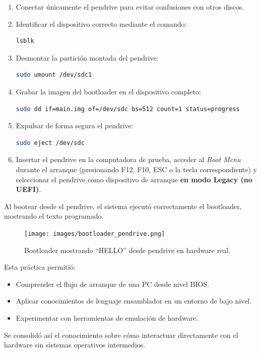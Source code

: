 \begin{enumerate}
    \item Conectar únicamente el pendrive para evitar confusiones con otros discos.
    \item Identificar el dispositivo correcto mediante el comando:
    \begin{lstlisting}[language=bash]
lsblk
    \end{lstlisting}
    \item Desmontar la partición montada del pendrive:
    \begin{lstlisting}[language=bash]
sudo umount /dev/sdc1
    \end{lstlisting}
    \item Grabar la imagen del bootloader en el dispositivo completo:
    \begin{lstlisting}[language=bash]
sudo dd if=main.img of=/dev/sdc bs=512 count=1 status=progress
    \end{lstlisting}
    \item Expulsar de forma segura el pendrive:
    \begin{lstlisting}[language=bash]
sudo eject /dev/sdc
    \end{lstlisting}
    \item Insertar el pendrive en la computadora de prueba, acceder al \textit{Boot Menu} durante el arranque (presionando F12, F10, ESC o la tecla correspondiente) y seleccionar el pendrive como dispositivo de arranque \textbf{en modo Legacy (no UEFI)}.
\end{enumerate}

Al bootear desde el pendrive, el sistema ejecutó correctamente el bootloader, mostrando el texto programado.

\begin{figure}[H]
    \centering
    \texttt{[image: images/bootloader\_pendrive.png]}
    \caption{Bootloader mostrando ``HELLO'' desde pendrive en hardware real.}
\end{figure}

Esta práctica permitió:
\begin{itemize}
    \item Comprender el flujo de arranque de una PC desde nivel BIOS.
    \item Aplicar conocimientos de lenguaje ensamblador en un entorno de bajo nivel.
    \item Experimentar con herramientas de emulación de hardware.
\end{itemize}

Se consolidó así el conocimiento sobre cómo interactuar directamente con el hardware sin sistemas operativos intermedios.

